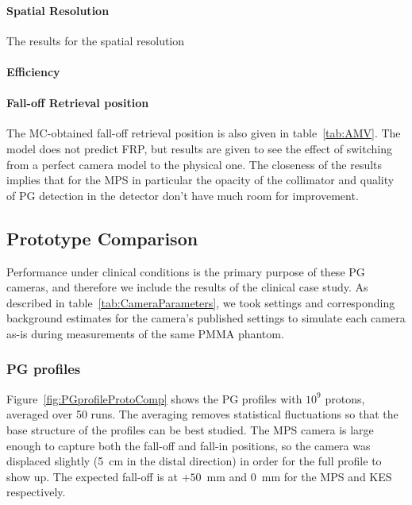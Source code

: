 \documentclass[a4paper,english,12pt]{article}
\begin{document}
\paragraph{Spatial Resolution} The results for the spatial resolution

\paragraph{Efficiency}

\paragraph{Fall-off Retrieval position} The MC-obtained fall-off retrieval position is also given in table~\ref{tab:AMV}. The model does not predict FRP, but results are given to see the effect of switching from a perfect camera model to the physical one. The closeness of the results implies that for the MPS in particular the opacity of the collimator and quality of PG detection in the detector don't have much room for improvement.


\subsection{Prototype Comparison}

Performance under clinical conditions is the primary purpose of these PG cameras, and therefore we include the results of the clinical case study. As described in table~\ref{tab:CameraParameters}, we took settings and corresponding background estimates for the camera's published settings to simulate each camera as-is during measurements of the same PMMA phantom.

\subsubsection{PG profiles}

Figure~\ref{fig:PGprofileProtoComp} shows the PG profiles with $10^9$ protons, averaged over 50 runs. The averaging removes statistical fluctuations so that the base structure of the profiles can be best studied. The MPS camera is large enough to capture both the fall-off and fall-in positions, so the camera was displaced slightly (5~cm in the distal direction) in order for the full profile to show up. The expected fall-off is at $+50$~mm and 0~mm for the MPS and KES respectively.
\end{document}

